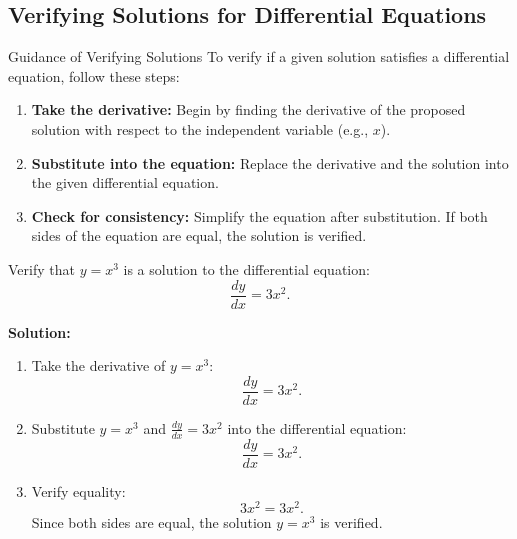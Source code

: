 \documentclass[12pt]{article}
\theoremstyle{beautifulthm}
\begin{document}
\subsection{Verifying Solutions for Differential Equations}

\begin{Note}{Guidance of Verifying Solutions}{}
To verify if a given solution satisfies a differential equation, follow these steps:

\begin{enumerate}
    \item \textbf{Take the derivative:} Begin by finding the derivative of the proposed solution with respect to the independent variable (e.g., \(x\)).
    \item \textbf{Substitute into the equation:} Replace the derivative and the solution into the given differential equation.
    \item \textbf{Check for consistency:} Simplify the equation after substitution. If both sides of the equation are equal, the solution is verified.
\end{enumerate}
    
\end{Note}


\begin{tcolorbox}[colback=examplebg, colframe=red!75!black, title=\textbf{EXAMPLE 1: Verifying the Solution}, fonttitle=\bfseries, sharp corners]

 Verify that \(y = x^3\) is a solution to the differential equation:
\[
\frac{dy}{dx} = 3x^2.
\]

\tcblower
\textbf{Solution:} 
\begin{enumerate}
    \item Take the derivative of \(y = x^3\):
    \[
    \frac{dy}{dx} = 3x^2.
    \]
    \item Substitute \(y = x^3\) and \(\frac{dy}{dx} = 3x^2\) into the differential equation:
    \[
    \frac{dy}{dx} = 3x^2.
    \]
    \item Verify equality:
    \[
    3x^2 = 3x^2.
    \]
    Since both sides are equal, the solution \(y = x^3\) is verified.
\end{enumerate}
\end{tcolorbox}
\end{document}
